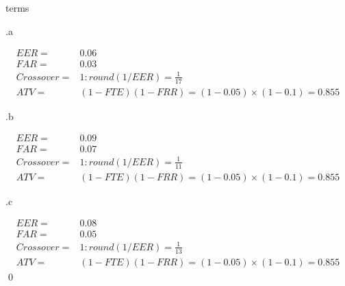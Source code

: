 \documentclass[
        ]{beamer}
\begin{document}
        \begin{frame}[c]{\subsecname terms}
            \begin{overprint}
            \end{overprint}   
        \end{frame}       
        
        \begin{frame}[c]{\subsecname.a}
            \begin{overprint}
                \begin{align*}
             EER=&0.06\\
             FAR=&0.03\\
             Crossover=&1:round(1/EER)=\frac{1}{17}\\
             ATV=&(1-FTE)(1-FRR)=(1-0.05)\times(1-0.1)=0.855
                \end{align*}
            \end{overprint}   
        \end{frame}       
        
        \begin{frame}[c]{\subsecname.b}
            \begin{overprint}
                \begin{align*}
             EER=&0.09\\
             FAR=&0.07\\
             Crossover=&1:round(1/EER)=\frac{1}{11}\\
             ATV=&(1-FTE)(1-FRR)=(1-0.05)\times(1-0.1)=0.855
                \end{align*}
            \end{overprint}   
        \end{frame}       
        
        \begin{frame}[c]{\subsecname.c}
            \begin{overprint}
                \begin{align*}
             EER=&0.08\\
             FAR=&0.05\\
             Crossover=&1:round(1/EER)=\frac{1}{13}\\
             ATV=&(1-FTE)(1-FRR)=(1-0.05)\times(1-0.1)=0.855
                \end{align*}\qed
            \end{overprint}   
        \end{frame}
\end{document}
